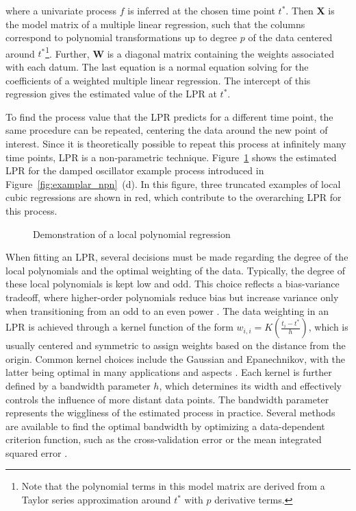 \documentclass[man, floatsintext]{apa7}
\begin{document}
\noindent where a univariate process $f$ is inferred at the
chosen time point $t^*$. Then \textbf{X} is the model matrix of a multiple
linear regression, such that the columns correspond to polynomial
transformations up to degree $p$ of the data centered around
$t^*$\footnote{Note
  that the polynomial terms in this model matrix are derived from a Taylor
  series approximation around $t^*$ with $p$ derivative terms.}. Further,
\textbf{W} is a diagonal matrix containing the weights associated with each
datum. The last equation is a normal equation solving for the coefficients of a
weighted multiple linear regression. The intercept of this regression
gives the estimated value of the LPR at $t^*$.

To find the process value that the LPR predicts for a different time point, the
same procedure can be repeated, centering the data around the new point of
interest. Since it is theoretically possible to repeat this process at
infinitely many time points, LPR is a non-parametric technique.
Figure~\ref{fig:locpol_dem} shows the estimated LPR for the damped oscillator
example process introduced in Figure~\ref{fig:examplar_npn}~(d). In this
figure, three truncated examples of local cubic regressions are shown in red,
which contribute to the overarching LPR for this process.\@

\begin{figure}[!t]
  \caption{Demonstration of a local polynomial regression}
  \label{fig:locpol_dem}
\end{figure}

When fitting an LPR, several decisions must be made regarding the degree of the
local polynomials and the optimal weighting of the data. Typically, the degree
of these local polynomials is kept low and odd. This choice reflects a
bias-variance tradeoff, where higher-order polynomials reduce bias but increase
variance only when transitioning from an odd to an even power
\parencite{ruppert_multivariate_1994}. The data weighting in an LPR is achieved
through a kernel function of the form $w_{i, i} = K(\frac{t_i - t^*}{h})$,
which is usually centered and symmetric to assign weights based on the distance
from the origin. Common kernel choices include the Gaussian and Epanechnikov,
with the latter being optimal in many applications and aspects
\parencite{fan_local_1997}. Each kernel is further defined by a bandwidth
parameter $h$, which determines its width and effectively controls the
influence of more distant data points. The bandwidth parameter represents the
wiggliness of the estimated process in practice. Several methods are available
to find the optimal bandwidth by optimizing a data-dependent criterion
function, such as the cross-validation error or the mean integrated squared
error \parencite{kohler_review_2014, debruyne_model_2008}.
\end{document}
